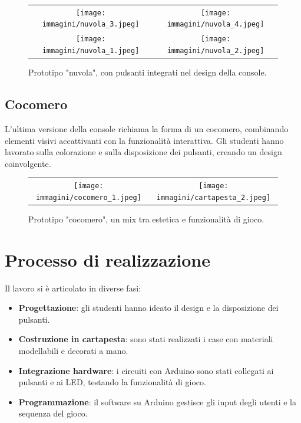\documentclass[a4paper,12pt]{report}
\begin{document}
\begin{figure}[h]
    \centering
    \begin{tabular}{c c}
       \texttt{[image: immagini/nuvola\_3.jpeg]} &
        \texttt{[image: immagini/nuvola\_4.jpeg]} \\
        \texttt{[image: immagini/nuvola\_1.jpeg]} &
        \texttt{[image: immagini/nuvola\_2.jpeg]} \\
       
    \end{tabular}
    \caption{Prototipo "nuvola", con pulsanti integrati nel design della console.}
    \label{fig:nuvola}
\end{figure}

\subsection{Cocomero}
L'ultima versione della console richiama la forma di un cocomero, combinando elementi visivi accattivanti con la funzionalità interattiva. Gli studenti hanno lavorato sulla colorazione e sulla disposizione dei pulsanti, creando un design coinvolgente.

\begin{figure}[h]
    \centering
    \begin{tabular}{c c}
        \texttt{[image: immagini/cocomero\_1.jpeg]} &
        \texttt{[image: immagini/cartapesta\_2.jpeg]} \\
    \end{tabular}
    \caption{Prototipo "cocomero", un mix tra estetica e funzionalità di gioco.}
    \label{fig:cocomero}
\end{figure}

\section{Processo di realizzazione}
Il lavoro si è articolato in diverse fasi:
\begin{itemize}
    \item \textbf{Progettazione}: gli studenti hanno ideato il design e la disposizione dei pulsanti.
    \item \textbf{Costruzione in cartapesta}: sono stati realizzati i case con materiali modellabili e decorati a mano.
    \item \textbf{Integrazione hardware}: i circuiti con Arduino sono stati collegati ai pulsanti e ai LED, testando la funzionalità di gioco.
    \item \textbf{Programmazione}: il software su Arduino gestisce gli input degli utenti e la sequenza del gioco.
\end{itemize}
\end{document}
